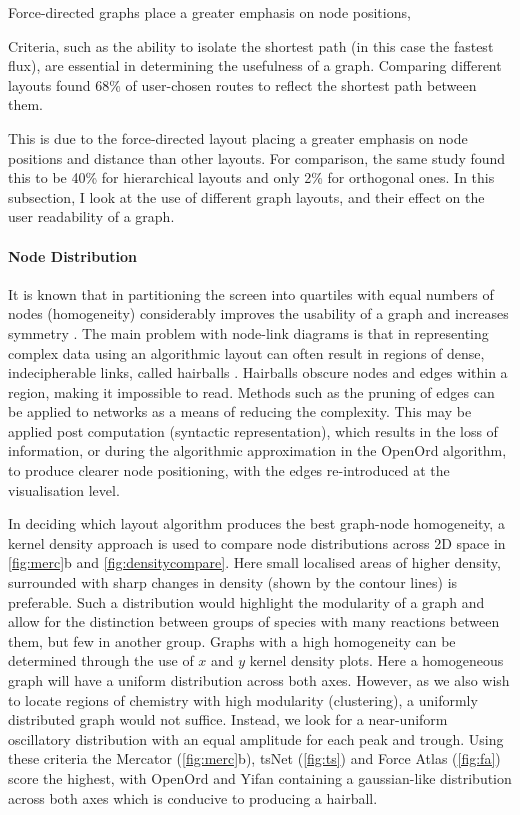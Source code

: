  Force-directed graphs place a greater emphasis on node positions,





Criteria, such as the ability to isolate the shortest path (in this case the fastest flux), are essential in determining the usefulness of a graph. Comparing different layouts \citep{eyetrack} found 68\% of user-chosen routes to reflect the shortest path between them. 

This is due to the force-directed layout placing a greater emphasis on node positions and distance than other layouts. For comparison, the same study found this to be 40\% for hierarchical layouts and only 2\% for orthogonal ones. In this subsection, I look at the use of different graph layouts, and their effect on the user readability of a graph. 


\paragraph{Node Distribution}\label{sec:nodedist}

It is known that in partitioning the screen into quartiles with equal numbers of nodes (homogeneity) considerably improves the usability of a graph and increases symmetry \citep{ch6graphredability}. The main problem with node-link diagrams is that in representing complex data using an algorithmic layout can often result in regions of dense, indecipherable links, called hairballs \citep{vislarge}. Hairballs obscure nodes and edges within a region, making it impossible to read. Methods such as the pruning of edges \citep{edgeprune} can be applied to networks as a means of reducing the complexity. This may be applied post computation (syntactic representation), which results in the loss of information, or during the algorithmic approximation in the OpenOrd algorithm, to produce clearer node positioning, with the edges re-introduced at the visualisation level. 

In deciding which layout algorithm produces the best graph-node homogeneity, a kernel density approach is used to compare node distributions across 2D space in \autoref{fig:merc}b and \autoref{fig:densitycompare}. 
Here small localised areas of higher density, surrounded with sharp changes in density (shown by the contour lines) is preferable. Such a distribution would highlight the modularity of a graph and allow for the distinction between groups of species with many reactions between them, but few in another group. Graphs with a high homogeneity can be determined through the use of $x$ and $y$ kernel density plots. Here a homogeneous graph will have a uniform distribution across both axes. However, as we also wish to locate regions of chemistry with high modularity (clustering), a uniformly distributed graph would not suffice. Instead, we look for a near-uniform oscillatory distribution with an equal amplitude for each peak and trough. Using these criteria the Mercator (\autoref{fig:merc}b), tsNet (\autoref{fig:ts}) and Force Atlas (\autoref{fig:fa}) score the highest, with OpenOrd and Yifan containing a gaussian-like distribution across both axes which is conducive to producing a hairball. 

